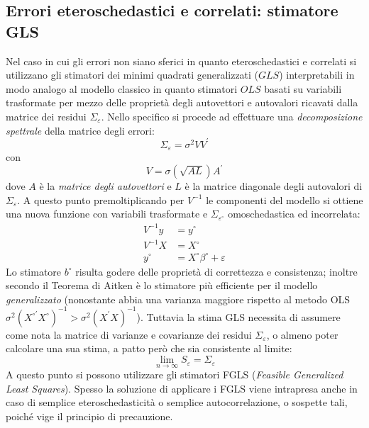 \documentclass[a4page, 11pt]{article} %
\begin{document}
\subsection*{Errori eteroschedastici e correlati: stimatore GLS}
Nel caso in cui gli errori non siano sferici in quanto eteroschedastici e correlati si utilizzano gli stimatori dei minimi quadrati generalizzati ($GLS$) interpretabili in modo analogo al modello classico in quanto stimatori $OLS$ basati su variabili trasformate per mezzo delle proprietà degli autovettori e autovalori ricavati dalla matrice dei residui $\Sigma_\varepsilon$.
Nello specifico si procede ad effettuare una \textit{decomposizione spettrale} della matrice degli errori:
\begin{equation*}
  \Sigma_\varepsilon = \sigma^2 V V^\prime
\end{equation*}
con
\begin{equation*}
V = \sigma (\sqrt{AL})A^\prime
\end{equation*}
dove $A$ è la \textit{matrice degli autovettori} e $L$ è la matrice diagonale degli autovalori di $\Sigma_\varepsilon$.
A questo punto premoltiplicando per $V^{-1}$ le componenti del modello si ottiene una nuova funzione con variabili trasformate e $\Sigma_{\varepsilon^\circ}$ omoschedastica ed incorrelata:
\begin{align*}
  V^{-1}y &= y^\circ \\
  V^{-1}X &= X^\circ \\
  y^\circ &= X^\circ \beta^\circ + \varepsilon
\end{align*}
Lo stimatore $b^\circ$ risulta godere delle proprietà di correttezza e consistenza; inoltre secondo il Teorema di Aitken è lo stimatore più efficiente per il modello \textit{generalizzato} (nonostante abbia una varianza maggiore rispetto al metodo OLS $\sigma^2 (X^{\circ \prime} X^\circ)^{-1} > \sigma^2 (X^\prime X)^{-1}$).
Tuttavia la stima GLS necessita di assumere come nota la matrice di varianze e covarianze dei residui $\Sigma_\varepsilon$, o almeno poter calcolare una sua stima, a patto però che sia consistente al limite:
\begin{equation*}
  \lim_{n\to \infty} S_\varepsilon = \Sigma_\varepsilon
\end{equation*}
A questo punto si possono utilizzare gli stimatori FGLS (\textit{Feasible Generalized Least Squares}).
Spesso la soluzione di applicare i FGLS viene intrapresa anche in caso di semplice eteroschedasticità o semplice autocorrelazione, o sospette tali, poiché vige il principio di precauzione.
\end{document}
